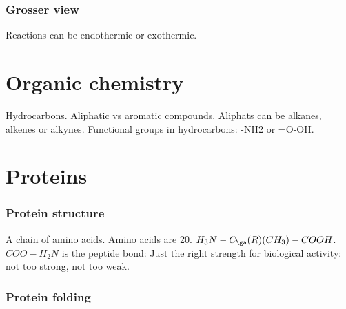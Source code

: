 \documentclass{article}
\begin{document}
\section{Grosser view}
Reactions can be endothermic or exothermic.

\part{Organic chemistry}
Hydrocarbons. Aliphatic vs aromatic compounds. Aliphats can be alkanes, alkenes or alkynes. Functional groups in hydrocarbons: -NH2 or =O-OH.


\part{Proteins}
\section{Protein structure}
A chain of amino acids. Amino acids are 20. $H_3N-C_\ga(R)(CH_3)-COOH$. $COO-H_2N$ is the peptide bond: Just the right strength for biological activity: not too strong, not too weak.

\section{Protein folding}
\tbc

% 
% 
\end{document}
